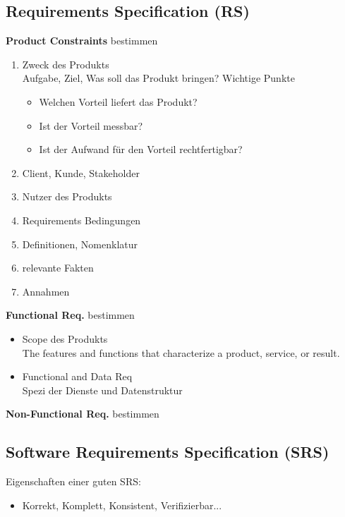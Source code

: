 \subsection{Requirements Specification (RS)}
\textbf{Product Constraints} bestimmen
\begin{enumerate}
	\item Zweck des Produkts\\
	Aufgabe, Ziel, Was soll das Produkt bringen? Wichtige Punkte
	\begin{itemize}
		\item Welchen Vorteil liefert das Produkt?
		\item Ist der Vorteil messbar?
		\item Ist der Aufwand für den Vorteil rechtfertigbar?
	\end{itemize}
	\item Client, Kunde, Stakeholder
	\item Nutzer des Produkts
	\item Requirements Bedingungen
	\item Definitionen, Nomenklatur
	\item relevante Fakten
	\item Annahmen
\end{enumerate}
\textbf{Functional Req.} bestimmen
\begin{itemize}
	\item Scope des Produkts\\
	The features and functions that characterize a product, service, or result.
	\item Functional and Data Req\\
	Spezi der Dienste und Datenstruktur
\end{itemize}
\textbf{Non-Functional Req.} bestimmen

\subsection{Software Requirements Specification (SRS)}
Eigenschaften einer guten SRS:
\begin{itemize}
	\item Korrekt, Komplett, Konsistent, Verifizierbar...
\end{itemize}

